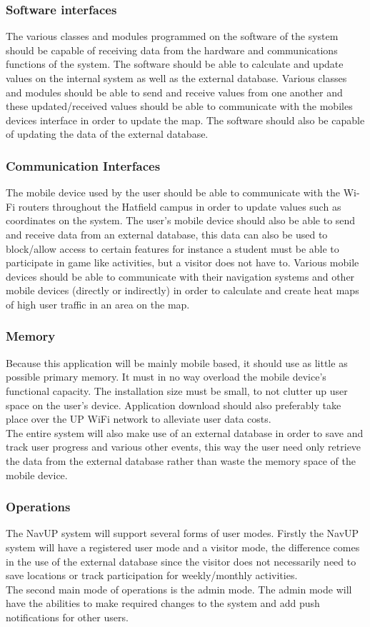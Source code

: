 \documentclass[a4paper,12pt]{article}
\begin{document}
\subsubsection{Software interfaces}
The various classes and modules programmed on the software of the system should be capable of receiving data from the hardware and communications functions of the system. The software should be able to calculate and update values on the internal system as well as the external database. Various classes and modules should be able to send and receive values from one another and these updated/received values should be able to communicate with the mobiles devices interface in order to update the map. The software should also be capable of updating the data of the external database.\\
\subsubsection{Communication Interfaces}
The mobile device used by the user should be able to communicate with the Wi-Fi routers throughout the Hatfield campus in order to update values such as coordinates on the system. The user’s mobile device should also be able to send and receive data from an external database, this data can also be used to block/allow access to certain features for instance a student must be able to participate in game like activities, but a visitor does not have to. Various mobile devices should be able to communicate with their navigation systems and other mobile devices (directly or indirectly) in order to calculate and create heat maps of high user traffic in an area on the map.
\subsubsection{Memory}
Because this application will be mainly mobile based, it should use as little as possible primary memory. It must in no way overload the mobile device's functional capacity. The installation size must be small, to not clutter up user space on the user's device. Application download should also preferably take place over the UP WiFi network to alleviate user data costs.\\
The entire system will also make use of an external database in order to save and track user progress and various other events, this way the user need only retrieve the data from the external database rather than waste the memory space of the mobile device.
\subsubsection{Operations}
The NavUP system will support several forms of user modes. Firstly the NavUP system will have a registered user mode and a visitor mode, the difference comes in the use of the external database since the visitor does not necessarily need to save locations or track participation for weekly/monthly activities.\\
The second main mode of operations is the admin mode. The admin mode will have the abilities to make required changes to the system and add push notifications for other users. 
\end{document}
